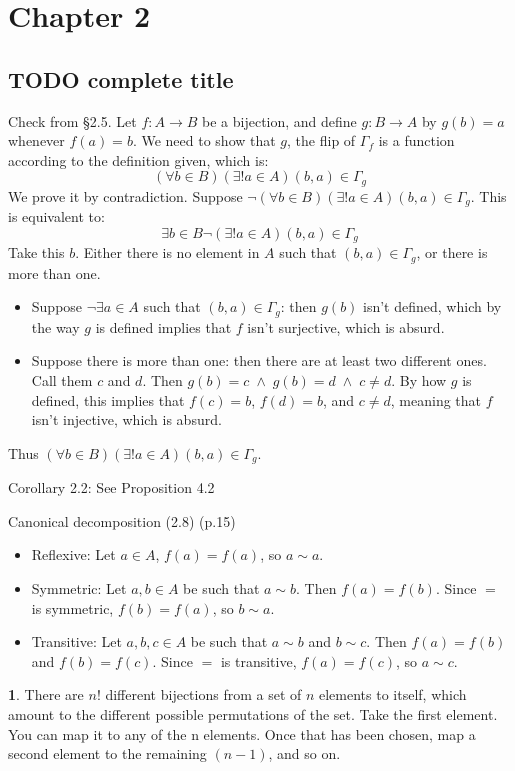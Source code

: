 \documentclass{article}
\theoremstyle{definition}
\newcommand{\AND}{\;\wedge\;}
\theoremstyle{definition}
\theoremstyle{definition}
\newtheorem{solution-internal}{}[subsection]
\newenvironment{solution}{
  \medskip
  \begin{solution-internal}
}{
  \end{solution-internal}
}
\begin{document}
\section*{Chapter 2}
\subsection*{TODO complete title}
\setcounter{subsection}{2}
\setcounter{solution-internal}{0}

Check from \S 2.5.
Let $f \colon A \to B$ be a bijection, and define $g \colon B \to A$ by $g(b)=a$ whenever $f(a)=b$. We need to show that $g$, the flip of $\Gamma_f$ is a
function according to the definition given, which is:
\[ (\forall b \in B)(\exists! a \in A) (b,a) \in \Gamma_g \]
We prove it by contradiction. Suppose $\neg (\forall b \in B)(\exists! a \in A)
(b,a) \in \Gamma_g$. This is equivalent to:
\[ \exists b \in B \neg (\exists! a \in A) (b,a) \in \Gamma_g \]
Take this $b$. Either there is no element in $A$ such that $(b,a) \in \Gamma_g$, or there is more than one.
\begin{itemize}
\item Suppose $\neg \exists a \in A$ such that $(b,a) \in \Gamma_g$: then
$g(b)$ isn't defined, which by the way $g$ is defined implies that $f$ isn't
surjective, which is absurd.
\item Suppose there is more than one: then there are at least two different ones. Call them $c$ and $d$. Then $g(b) = c \AND g(b) = d \AND c \neq d$. By how $g$ is defined, this implies that $f(c) = b$, $f(d) = b$, and $c \neq d$, meaning that $f$ isn't injective, which is absurd.
\end{itemize}
Thus $(\forall b \in B)(\exists! a \in A) (b,a) \in \Gamma_g$.

Corollary 2.2: See Proposition 4.2

Canonical decomposition (2.8) (p.15)
\begin{itemize}
\item Reflexive: Let $a \in A$, $f(a) = f(a)$, so $a \sim a$.
\item Symmetric: Let $a, b \in A$ be such that $a \sim b$. Then $f(a) = f(b)$. Since $=$ is symmetric, $f(b) = f(a)$, so $b \sim a$.
\item Transitive: Let $a, b, c \in A$ be such that $a \sim b$ and $b \sim c$. Then $f(a) = f(b)$ and $f(b) = f(c)$. Since $=$ is transitive, $f(a) = f(c)$, so $a \sim c$.
\end{itemize}


\begin{solution}
There are $n!$ different bijections from a set of $n$ elements to itself, which
amount to the different possible permutations of the set. Take the first
element. You can map it to any of the n elements. Once that has been chosen,
map a second element to the remaining $(n-1)$, and so on.
\end{solution}
\end{document}
